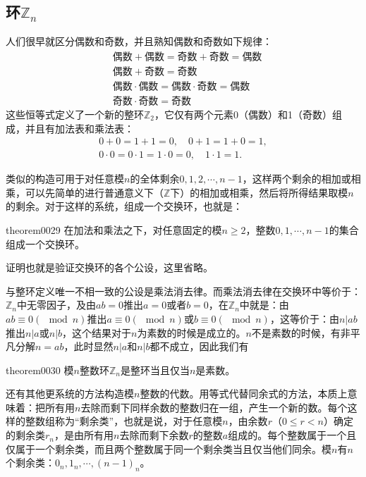 \subsection{环$\mathbb{Z}_n$}
人们很早就区分偶数和奇数，并且熟知偶数和奇数如下规律：
\[
\begin{aligned}
&\text{偶数}+\text{偶数} = \text{奇数} + \text{奇数} = \text{偶数}\\
&\text{偶数}+\text{奇数} = \text{奇数}\\
&\text{偶数}\cdot\text{偶数} = \text{偶数}\cdot\text{奇数} = \text{偶数}\\
&\text{奇数} \cdot \text{奇数} = \text{奇数}
\end{aligned}
\]
这些恒等式定义了一个新的整环$\mathbb{Z}_2$，它仅有两个元素0（偶数）和1（奇数）组成，并且有加法表和乘法表：
\begin{gather*}
0+0=1+1=0, \quad 0+1=1+0=1,\\
0 \cdot 0=0 \cdot 1= 1 \cdot 0 =0,\quad 1 \cdot 1 = 1.
\end{gather*}

类似的构造可用于对任意模$n$的全体剩余$0,1,2,\cdots,n-1$，这样两个剩余的相加或相乘，可以先简单的进行普通意义下（$\mathbb{Z}$下）的相加或相乘，然后将所得结果取模$n$的剩余。对于这样的系统，组成一个交换环，也就是：
\begin{theorem}{}{theorem0029}
在加法和乘法之下，对任意固定的模$n \ge 2$，整数$0, 1, \cdots, n-1$的集合组成一个交换环。
\end{theorem}

证明也就是验证交换环的各个公设，这里省略。

与整环定义唯一不相一致的公设是乘法消去律。而乘法消去律在交换环中等价于：$\mathbb{Z}_n$中无零因子，及由$ab=0$推出$a=0$或者$b=0$，在$\mathbb{Z}_n$中就是：由$ab \equiv 0(\mod{n})$推出$a \equiv 0(\mod{n})$或$b \equiv 0(\mod{n})$，这等价于：由$n|ab$推出$n|a$或$n|b$，这个结果对于$n$为素数的时候是成立的。$n$不是素数的时候，有非平凡分解$n=ab$，此时显然$n|a$和$n|b$都不成立，因此我们有
\begin{theorem}{}{theorem0030}
模$n$整数环$\mathbb{Z}_n$是整环当且仅当$n$是素数。
\end{theorem}

还有其他更系统的方法构造模$n$整数的代数。用等式代替同余式的方法，本质上意味着：把所有用$n$去除而剩下同样余数的整数归在一组，产生一个新的数。每个这样的整数组称为“剩余类”，也就是说，对于任意模$n$，由余数$r$（$0 \le r < n$）确定的剩余类$r_n$，是由所有用$n$去除而剩下余数$r$的整数$a$组成的。每个整数属于一个且仅属于一个剩余类，而且两个整数属于同一个剩余类当且仅当他们同余。模$n$有$n$个剩余类：$0_n,1_n,\cdots,(n-1)_n$。


